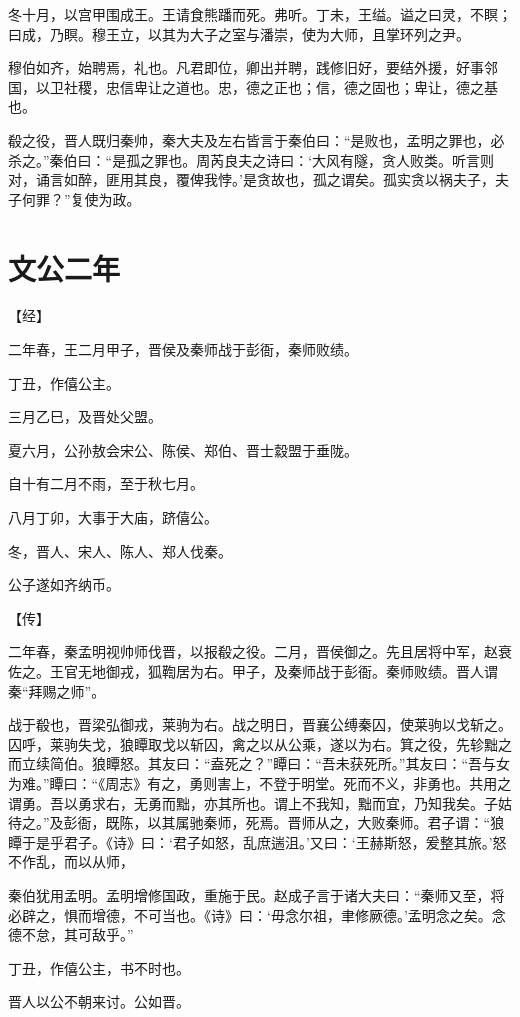 \documentclass[a4paper,12pt,UTF8,twoside]{ctexbook}
\begin{document}
冬十月，以宫甲围成王。王请食熊蹯而死。弗听。丁未，王缢。谥之曰灵，不瞑；曰成，乃瞑。穆王立，以其为大子之室与潘崇，使为大师，且掌环列之尹。

穆伯如齐，始聘焉，礼也。凡君即位，卿出并聘，践修旧好，要结外援，好事邻国，以卫社稷，忠信卑让之道也。忠，德之正也；信，德之固也；卑让，德之基也。

殽之役，晋人既归秦帅，秦大夫及左右皆言于秦伯曰：“是败也，孟明之罪也，必杀之。”秦伯曰：“是孤之罪也。周芮良夫之诗曰：‘大风有隧，贪人败类。听言则对，诵言如醉，匪用其良，覆俾我悖。’是贪故也，孤之谓矣。孤实贪以祸夫子，夫子何罪？”复使为政。

\chapter{文公二年}


【经】

二年春，王二月甲子，晋侯及秦师战于彭衙，秦师败绩。

丁丑，作僖公主。

三月乙巳，及晋处父盟。

夏六月，公孙敖会宋公、陈侯、郑伯、晋士縠盟于垂陇。

自十有二月不雨，至于秋七月。

八月丁卯，大事于大庙，跻僖公。

冬，晋人、宋人、陈人、郑人伐秦。

公子遂如齐纳币。

【传】

二年春，秦孟明视帅师伐晋，以报殽之役。二月，晋侯御之。先且居将中军，赵衰佐之。王官无地御戎，狐鞫居为右。甲子，及秦师战于彭衙。秦师败绩。晋人谓秦“拜赐之师”。

战于殽也，晋梁弘御戎，莱驹为右。战之明日，晋襄公缚秦囚，使莱驹以戈斩之。囚呼，莱驹失戈，狼瞫取戈以斩囚，禽之以从公乘，遂以为右。箕之役，先轸黜之而立续简伯。狼瞫怒。其友曰：“盍死之？”瞫曰：“吾未获死所。”其友曰：“吾与女为难。”瞫曰：“《周志》有之，勇则害上，不登于明堂。死而不义，非勇也。共用之谓勇。吾以勇求右，无勇而黜，亦其所也。谓上不我知，黜而宜，乃知我矣。子姑待之。”及彭衙，既陈，以其属驰秦师，死焉。晋师从之，大败秦师。君子谓：“狼瞫于是乎君子。《诗》曰：‘君子如怒，乱庶遄沮。’又曰：‘王赫斯怒，爰整其旅。’怒不作乱，而以从师，

秦伯犹用孟明。孟明增修国政，重施于民。赵成子言于诸大夫曰：“秦师又至，将必辟之，惧而增德，不可当也。《诗》曰：‘毋念尔祖，聿修厥德。’孟明念之矣。念德不怠，其可敌乎。”

丁丑，作僖公主，书不时也。

晋人以公不朝来讨。公如晋。
\end{document}
